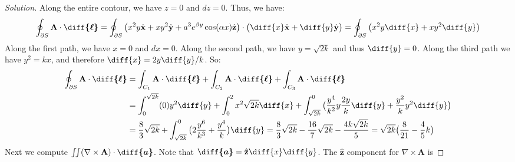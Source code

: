 \documentclass[crop=false,class=article,oneside]{standalone}
\begin{document}
        \begin{proof}[Solution]
            Along the entire contour, we have $z=0$ and $dz=0$.
            Thus, we have:
            \begin{equation*}
                \oint_{\partial S}
                \mathbf{A}\cdot\boldsymbol{\diff{\ell}}
                =\oint_{\partial S}
                \big(
                     x^{2}y\hat{\mathbf{x}}
                    +xy^{2}\hat{\mathbf{y}}
                    +a^{3}e^{\beta{y}}\cos(\alpha{x})\hat{\mathbf{z}}
                \big)
                \cdot\big(
                     \diff{x}\hat{\mathbf{x}}
                    +\diff{y}\hat{\mathbf{y}}
                \big)
                =\oint_{\partial S}
                \big(x^{2}y\diff{x}+xy^{2}\diff{y}\big)
            \end{equation*}
            Along the first path, we have $x=0$ and $dx=0$.
            Along the second path, we
            have $y=\sqrt{2k}$ and thus $\diff{y}=0$.
            Along the third path we have $y^{2}=kx$,
            and therefore $\diff{x}=2y\diff{y}/k$. So:
            \begin{align*}
                \oint_{\partial S}
                \mathbf{A}\cdot\boldsymbol{\diff{\ell}}
                &=\int_{C_{1}}\mathbf{A}
                \cdot\boldsymbol{\diff{\ell}}
                +\int_{C_{2}}\mathbf{A}
                \cdot\boldsymbol{\diff{\ell}}
                +\int_{C_{3}}
                \mathbf{A}\cdot\boldsymbol{\diff{\ell}}\\
                &=\int_{0}^{\sqrt{2k}}(0)y^{2}\diff{y}
                 +\int_{0}^{2}x^{2}\sqrt{2k}\diff{x}
                 +\int_{\sqrt{2k}}^{0}\big(
                    \frac{y^{4}}{k^2}y\frac{2y}{k}\diff{y}
                    +\frac{y^{2}}{k}y^{2}\diff{y}
                \big)\\
                &=\frac{8}{3}\sqrt{2k}
                 +\int_{\sqrt{2k}}^{0}\big(2\frac{y^{6}}{k^{3}}
                 +\frac{y^{4}}{k}\big)\diff{y}
                =\frac{8}{3}\sqrt{2k}
                -\frac{16}{7}\sqrt{2k}
                -\frac{4k\sqrt{2k}}{5}
                =\sqrt{2k}\big(\frac{8}{21}-\frac{4}{5}k\big)
            \end{align*}
            Next we compute
            $\iint(\nabla\times\mathbf{A})%
             \cdot\boldsymbol{\diff{a}}$.
            Note that
            $\boldsymbol{\diff{a}}%
             =\hat{\mathbf{z}}\diff{x}\diff{y}$.
            The $\hat{\mathbf{z}}$
            component for $\nabla\times\mathbf{A}$ is

\end{proof}
\end{document}
